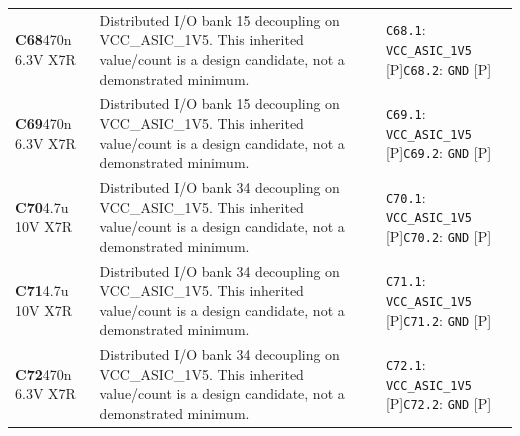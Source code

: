 \documentclass[11pt,a4paper]{article}
\begin{document}
\begin{longtable}{@{}P{27mm}P{83mm}P{58mm}@{}}
\textbf{C68}\newline 470n 6.3V X7R & Distributed I/O bank 15 decoupling on VCC\_ASIC\_1V5. This inherited value/count is a design candidate, not a demonstrated minimum. & \nolinkurl{C68.1}: \nolinkurl{VCC_ASIC_1V5} [P]\newline \nolinkurl{C68.2}: \nolinkurl{GND} [P] \\
\textbf{C69}\newline 470n 6.3V X7R & Distributed I/O bank 15 decoupling on VCC\_ASIC\_1V5. This inherited value/count is a design candidate, not a demonstrated minimum. & \nolinkurl{C69.1}: \nolinkurl{VCC_ASIC_1V5} [P]\newline \nolinkurl{C69.2}: \nolinkurl{GND} [P] \\
\textbf{C70}\newline 4.7u 10V X7R & Distributed I/O bank 34 decoupling on VCC\_ASIC\_1V5. This inherited value/count is a design candidate, not a demonstrated minimum. & \nolinkurl{C70.1}: \nolinkurl{VCC_ASIC_1V5} [P]\newline \nolinkurl{C70.2}: \nolinkurl{GND} [P] \\
\textbf{C71}\newline 4.7u 10V X7R & Distributed I/O bank 34 decoupling on VCC\_ASIC\_1V5. This inherited value/count is a design candidate, not a demonstrated minimum. & \nolinkurl{C71.1}: \nolinkurl{VCC_ASIC_1V5} [P]\newline \nolinkurl{C71.2}: \nolinkurl{GND} [P] \\
\textbf{C72}\newline 470n 6.3V X7R & Distributed I/O bank 34 decoupling on VCC\_ASIC\_1V5. This inherited value/count is a design candidate, not a demonstrated minimum. & \nolinkurl{C72.1}: \nolinkurl{VCC_ASIC_1V5} [P]\newline \nolinkurl{C72.2}: \nolinkurl{GND} [P] \\

\end{longtable}
\end{document}
